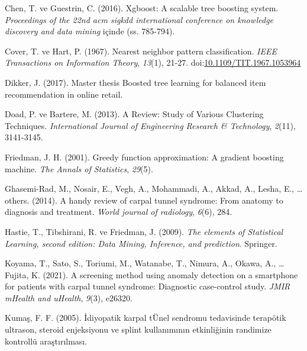 \documentclass[12pt,twoside]{deuthesis}
\begin{document}
\begin{CSLReferences}{1}{0}
\leavevmode{}%
Chen, T. ve Guestrin, C. (2016). Xgboost: A scalable tree boosting system. \emph{Proceedings of the 22nd acm sigkdd international conference on knowledge discovery and data mining} içinde (ss. 785-794).

\leavevmode{}%
Cover, T. ve Hart, P. (1967). Nearest neighbor pattern classification. \emph{IEEE Transactions on Information Theory}, \emph{13}(1), 21-27. doi:\href{https://doi.org/10.1109/TIT.1967.1053964}{10.1109/TIT.1967.1053964}

\leavevmode{}%
Dikker, J. (2017). Master thesis Boosted tree learning for balanced item recommendation in online retail.

\leavevmode{}%
Doad, P. ve Bartere, M. (2013). A Review: Study of Various Clustering Techniques. \emph{International Journal of Engineering Research \& Technology}, \emph{2}(11), 3141-3145.

\leavevmode{}%
Friedman, J. H. (2001). Greedy function approximation: A gradient boosting machine. \emph{The Annals of Statistics}, \emph{29}(5).

\leavevmode{}%
Ghasemi-Rad, M., Nosair, E., Vegh, A., Mohammadi, A., Akkad, A., Lesha, E., \ldots{} others. (2014). A handy review of carpal tunnel syndrome: From anatomy to diagnosis and treatment. \emph{World journal of radiology}, \emph{6}(6), 284.

\leavevmode{}%
Hastie, T., Tibshirani, R. ve Friedman, J. (2009). \emph{The elements of Statistical Learning, second edition: Data Mining, Inference, and prediction}. Springer.

\leavevmode{}%
Koyama, T., Sato, S., Toriumi, M., Watanabe, T., Nimura, A., Okawa, A., \ldots{} Fujita, K. (2021). A screening method using anomaly detection on a smartphone for patients with carpal tunnel syndrome: Diagnostic case-control study. \emph{JMIR mHealth and uHealth}, \emph{9}(3), e26320.

\leavevmode{}%
Kumaş, F. F. (2005). İdiyopatik karpal tÜnel sendromu tedavisinde terapötik ultrason, steroid enjeksiyonu ve splint kullanımının etkinliğinin randimize kontrollü araştırılması.


\end{CSLReferences}
\end{document}
